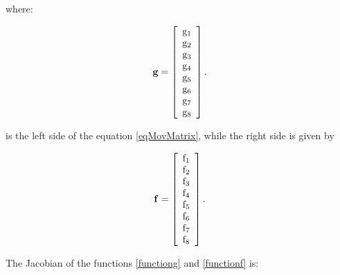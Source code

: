 \documentclass[sublist]{fei}
\begin{document}
where:

\begin{equation} \label{functiong}
    {\bf g} = \left[ \begin{array}{c} {\rm g}_1 \\ {\rm g}_2 \\ {\rm g}_3 \\ {\rm g}_4 \\ {\rm g}_5 \\ {\rm g}_6 \\ {\rm g}_7 \\ {\rm g}_8 \end{array} \right].
\end{equation}

is the left side of the equation \eqref{eqMovMatrix}, while the right side is given by

\begin{equation} \label{functionf}
    {\bf f} = \left[ \begin{array}{c} {\rm f}_1 \\ {\rm f}_2 \\ {\rm f}_3 \\ {\rm f}_4 \\ {\rm f}_5 \\ {\rm f}_6 \\ {\rm f}_7 \\ {\rm f}_8 \end{array} \right].
\end{equation}

The Jacobian of the functions \eqref{functiong} and \eqref{functionf} is:
\end{document}
